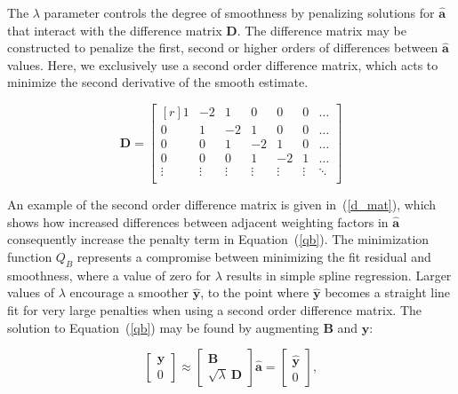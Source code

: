 \documentclass[num-refs]{wiley-article}
\begin{document}
The $\lambda$ parameter controls the degree of smoothness by penalizing solutions for $\hat{\mathbf{a}}$ that interact with the difference matrix $\mathbf{D}$. The difference matrix may be constructed to penalize the first, second or higher orders of differences between $\hat{\mathbf{a}}$ values. Here, we exclusively use a second order difference matrix, which acts to minimize the second derivative of the smooth estimate.

\begin{equation}
  \mathbf{D} =
  \begin{bmatrix*}[r]
    1 & -2 &  1 &  0 &  0 &  0 & \dots \\
    0 &  1 & -2 &  1 &  0 &  0 & \dots \\
    0 &  0 &  1 & -2 &  1 &  0 & \dots \\
    0 &  0 &  0 &  1 & -2 &  1 & \dots \\
    \vdots & \vdots & \vdots & \vdots & \vdots & \vdots & \ddots \\
  \end{bmatrix*}
  \label{d_mat}
\end{equation}

An example of the second order difference matrix is given in~(\ref{d_mat}), which shows how increased differences between adjacent weighting factors in $\hat{\mathbf{a}}$ consequently increase the penalty term in Equation~(\ref{qb}). The minimization function $Q_{B}$ represents a compromise between minimizing the fit residual and smoothness, where a value of zero for $\lambda$ results in simple spline regression. Larger values of $\lambda$ encourage a smoother $\hat{\mathbf{y}}$, to the point where $\hat{\mathbf{y}}$ becomes a straight line fit for very large penalties when using a second order difference matrix. The solution to Equation~(\ref{qb}) may be found by augmenting $\mathbf{B}$ and $\mathbf{y}$:

\begin{equation}
  \begin{bmatrix}
    \mathbf{y} \\ 0
  \end{bmatrix}
  \approx
  \begin{bmatrix}
    \mathbf{B} \\ \sqrt{\lambda} \ \mathbf{D}
  \end{bmatrix} \hat{\mathbf{a}} =
  \begin{bmatrix}
    \hat{\mathbf{y}} \\ 0
  \end{bmatrix},
  \label{p-spline_eq}
\end{equation}
\end{document}
